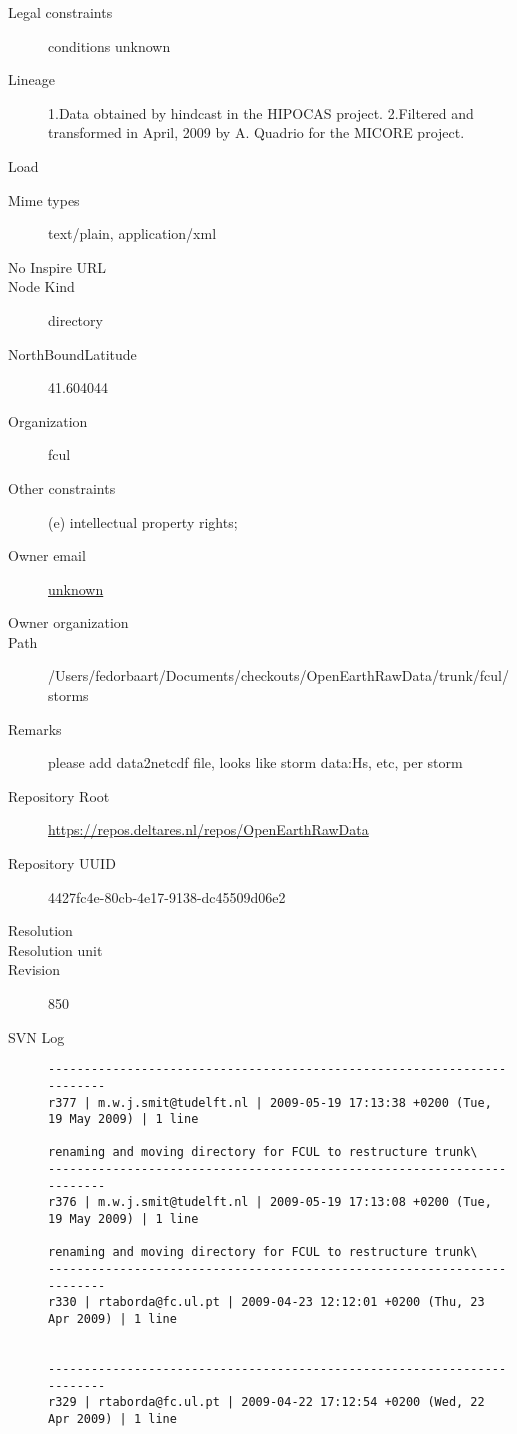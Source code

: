 \documentclass[9]{report}
\begin{document}
\begin{description}
  \item[Legal constraints] conditions unknown
  \item[Lineage] 1.Data obtained by hindcast in the HIPOCAS project.
2.Filtered and transformed in April, 2009 by A. Quadrio for the MICORE project.
  \item[Load] \textcolor{blue}{}
  \item[Mime types] text/plain, application/xml
  \item[No Inspire URL] 
  \item[Node Kind] directory
  \item[NorthBoundLatitude] 41.604044
  \item[Organization] fcul
  \item[Other constraints] (e) intellectual property rights;
  \item[Owner email] \href{mailto:unknown}{unknown}
  \item[Owner organization] 
  \item[Path] /Users/fedorbaart/Documents/checkouts/OpenEarthRawData/trunk/fcul/storms
  \item[Remarks] please add data2netcdf file, looks like storm data:Hs, etc, per storm
  \item[Repository Root] \href{https://repos.deltares.nl/repos/OpenEarthRawData}{https://repos.deltares.nl/repos/OpenEarthRawData}
  \item[Repository UUID] 4427fc4e-80cb-4e17-9138-dc45509d06e2
  \item[Resolution] 
  \item[Resolution unit] 
  \item[Revision] 850
  \item[SVN Log] \begin{verbatim}
------------------------------------------------------------------------
r377 | m.w.j.smit@tudelft.nl | 2009-05-19 17:13:38 +0200 (Tue, 19 May 2009) | 1 line

renaming and moving directory for FCUL to restructure trunk\
------------------------------------------------------------------------
r376 | m.w.j.smit@tudelft.nl | 2009-05-19 17:13:08 +0200 (Tue, 19 May 2009) | 1 line

renaming and moving directory for FCUL to restructure trunk\
------------------------------------------------------------------------
r330 | rtaborda@fc.ul.pt | 2009-04-23 12:12:01 +0200 (Thu, 23 Apr 2009) | 1 line


------------------------------------------------------------------------
r329 | rtaborda@fc.ul.pt | 2009-04-22 17:12:54 +0200 (Wed, 22 Apr 2009) | 1 line



\end{verbatim}
\end{description}
\end{document}
